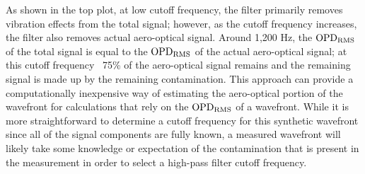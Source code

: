 As shown in the top plot, at low cutoff frequency, the filter primarily removes vibration effects from the total signal; however, as the cutoff frequency increases, the filter also removes actual aero-optical signal.
Around 1,200 Hz, the $\operatorname{OPD_{RMS}}$ of the total signal is equal to the $\operatorname{OPD_{RMS}}$ of the actual aero-optical signal; at this cutoff frequency ~75\% of the aero-optical signal remains and the remaining signal is made up by the remaining contamination.
This approach can provide a computationally inexpensive way of estimating the aero-optical portion of the wavefront for calculations that rely on the $\operatorname{OPD_{RMS}}$ of a wavefront.
While it is more straightforward to determine a cutoff frequency for this synthetic wavefront since all of the signal components are fully known, a measured wavefront will likely take some knowledge or expectation of the contamination that is present in the measurement in order to select a high-pass filter cutoff frequency.

% 


